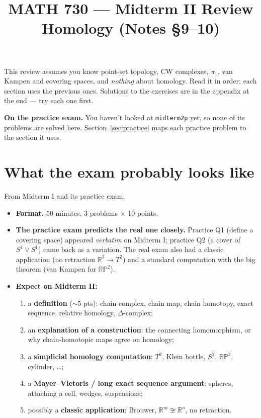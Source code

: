 \documentclass[11pt]{article}
\title{MATH 730 --- Midterm II Review\\\large Homology (Notes \S9--10)}
\date{}
\newcommand{\R}{\mathbb R}
\newcommand{\RP}{\mathbb{RP}}
\theoremstyle{definition}
\begin{document}
\maketitle

This review assumes you know point-set topology, CW complexes, $\pi_1$, van Kampen and covering spaces, and \emph{nothing} about homology. Read it in order; each section uses the previous ones. Solutions to the exercises are in the appendix at the end --- try each one first.

\begin{note}
\textbf{On the practice exam.} You haven't looked at \texttt{midterm2p} yet, so none of its problems are solved here. Section~\ref{sec:practice} maps each practice problem to the section it uses.
\end{note}

\tableofcontents

\section{What the exam probably looks like}

From Midterm I and its practice exam:
\begin{itemize}
\item \textbf{Format.} 50 minutes, 3 problems $\times$ 10 points.
\item \textbf{The practice exam predicts the real one closely.} Practice Q1 (define a covering space) appeared \emph{verbatim} on Midterm I; practice Q2 (a cover of $S^1\vee S^1$) came back as a variation. The real exam also had a classic application (no retraction $\R^3\to T^2$) and a standard computation with the big theorem (van Kampen for $\RP^2$).
\item \textbf{Expect on Midterm II:}
\begin{enumerate}
\item a \textbf{definition} ($\sim$5 pts): chain complex, chain map, chain homotopy, exact sequence, relative homology, $\Delta$-complex;
\item an \textbf{explanation of a construction}: the connecting homomorphism, or why chain-homotopic maps agree on homology;
\item a \textbf{simplicial homology computation}: $T^2$, Klein bottle, $S^2$, $\RP^2$, cylinder, \dots;
\item a \textbf{Mayer--Vietoris / long exact sequence argument}: spheres, attaching a cell, wedges, suspensions;
\item possibly a \textbf{classic application}: Brouwer, $\R^m\not\cong\R^n$, no retraction.
\end{enumerate}
\end{itemize}
\end{document}
